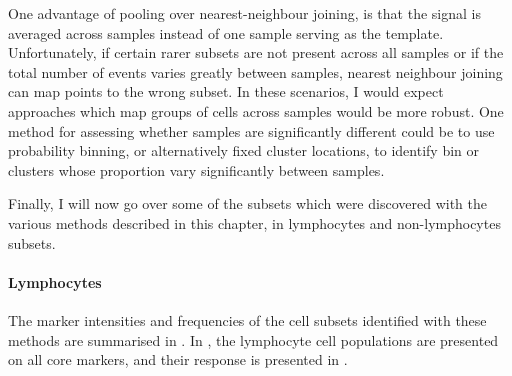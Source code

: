 One advantage of pooling over nearest-neighbour joining, is that the signal is averaged across samples instead of one sample serving as the template.
Unfortunately, if certain rarer subsets are not present across all samples or if the total number of events varies greatly between samples, nearest neighbour joining can map points to the wrong subset.
In these scenarios, I would expect approaches which map groups of cells across samples would be more robust.
One method for assessing whether samples are significantly different could be to use probability binning, or alternatively fixed cluster locations, to identify bin or clusters whose proportion vary significantly between samples.


Finally, I will now go over some of the subsets which were discovered with the various methods described in this chapter, in lymphocytes and non-lymphocytes subsets.

\clearpage

\paragraph{Lymphocytes}

The marker intensities and frequencies of the cell subsets identified with these methods are summarised in .
In , the lymphocyte cell populations are presented on all core markers, and their response is presented in .

